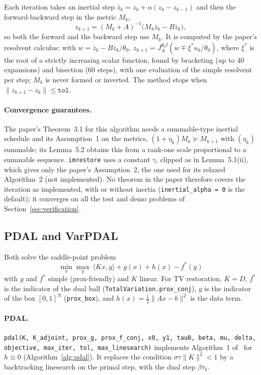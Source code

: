 \documentclass[11pt,a4paper]{article}
\newcommand{\code}[1]{\texttt{#1}}
\begin{document}
Each iteration takes an inertial step
$\bar z_k = z_k + \alpha(z_k-z_{k-1})$ and then the forward-backward step in
the metric $M_k$,
\[
  z_{k+1} = (M_k+A)^{-1}\bigl(M_k\bar z_k - B\bar z_k\bigr),
\]
so both the forward and the backward step use $M_k$. It is computed by the
paper's resolvent calculus: with $w=\bar z_k - B\bar z_k/\theta_0$,
$z_{k+1} = J_A^{\theta_0I}(w \mp \xi^*u_k/\theta_0)$, where $\xi^*$ is the
root of a strictly increasing scalar function, found by bracketing (up to 40
expansions) and bisection (60 steps), with one evaluation of the simple
resolvent per step; $M_k$ is never formed or inverted. The method stops when
$\|z_{k+1}-z_k\|\le\code{tol}$.

\paragraph{Convergence guarantees.} The paper's Theorem~3.1 for this
algorithm needs a summable-type inertial schedule and its Assumption~1 on the
metrics, $(1+\eta_k)M_k\succeq M_{k+1}$ with $(\eta_k)$ summable; its
Lemma~5.2 obtains this from a rank-one scale proportional to a summable
sequence. \texttt{imrestore} uses a constant $\gamma$, clipped as in
Lemma~5.1(ii), which gives only the paper's Assumption~2, the one used for its
relaxed Algorithm~2 (not implemented). No theorem in the paper therefore
covers the iteration as implemented, with or without inertia
(\code{inertial\_alpha = 0} is the default); it converges on all the test
and demo problems of Section~\ref{sec:verification}.

\subsection{PDAL and VarPDAL}

Both solve the saddle-point problem
\begin{equation}\label{eq:saddle}
  \min_x\max_y\ \langle Kx,y\rangle + g(x) + h(x) - f^*(y)
\end{equation}
with $g$ and $f^*$ simple (prox-friendly) and $K$ linear. For TV
restoration, $K=D$, $f^*$ is the indicator of the dual ball
(\code{TotalVariation.prox\_conj}), $g$ is the indicator of the box
$[0,1]^N$ (\code{prox\_box}), and $h(x)=\tfrac12\|Ax-b\|^2$ is the data term.

\paragraph{PDAL.} \code{pdal(K, K\_adjoint, prox\_g, prox\_f\_conj, x0,
y1, tau0, beta, mu, delta, objective, max\_iter, tol, max\_linesearch)}
implements Algorithm~1 of~\cite{MalitskyPock2018} for $h\equiv0$
(Algorithm~\ref{alg:pdal}). It replaces the condition $\sigma\tau\|K\|^2<1$
by a backtracking linesearch on the primal step, with the dual step
$\beta\tau_k$.
\end{document}
